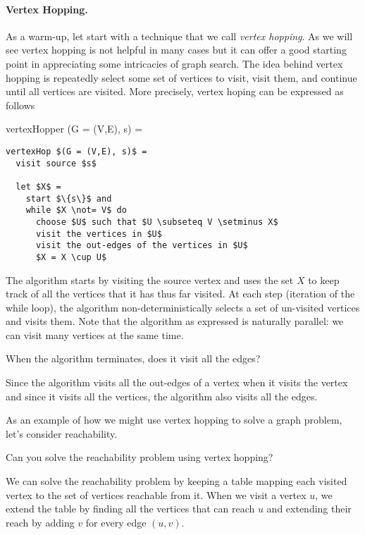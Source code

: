\begin{notesonly}
\paragraph{Vertex Hopping.}

As a warm-up, let start with a technique that we call {\em vertex
  hopping}.  As we will see vertex hopping is not helpful in many
cases but it can offer a good starting point in appreciating some
intricacies of graph search.
%
The idea behind vertex hopping is repeatedly select some set of
vertices to visit, visit them, and continue until all vertices are
visited.  More precisely, vertex hoping can be expressed as follows

\begin{algorithm}
vertexHopper (G = (V,E), s) = 

\begin{lstlisting}
vertexHop $(G = (V,E), s)$ =
  visit source $s$

  let $X$ = 
    start $\{s\}$ and
    while $X \not= V$ do
      choose $U$ such that $U \subseteq V \setminus X$
      visit the vertices in $U$
      visit the out-edges of the vertices in $U$
      $X = X \cup U$    
\end{lstlisting}
\end{algorithm}

The algorithm starts by visiting the source vertex and uses the set
$X$ to keep track of all the vertices that it has thus far visited.
%
At each step (iteration of the while loop), the algorithm
non-deterministically selects a set of un-visited vertices and visits
them.
%
Note that the algorithm as expressed is naturally parallel: we can
visit many vertices at the same time.  
%

\begin{question}
When the algorithm terminates, does it visit all the edges? 
\end{question}
%
Since the algorithm visits all the out-edges of a vertex when it
visits the vertex and since it visits all the vertices, the algorithm
also visits all the edges.

As an example of how we might use vertex hopping to solve a graph
problem, let's consider reachability.  
%
\begin{question}
Can you solve the reachability problem using vertex hopping?
\end{question}
%
We can solve the reachability problem by keeping a table mapping each
visited vertex to the set of vertices reachable from it.  When 
we visit a vertex $u$, we extend the table by finding all the vertices
that can reach $u$ and extending their reach by adding $v$ for every
edge $(u,v)$.



\end{notesonly}
